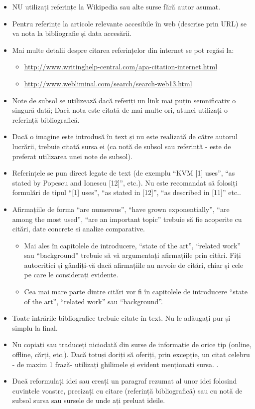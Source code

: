 \documentclass[12pt,a4paper]{report}
\begin{document}
\begin{itemize}
	\item 	NU utilizați referințe la Wikipedia sau alte surse fără autor asumat.
	\item 	Pentru referințe la articole relevante accesibile în web (descrise prin URL) se va nota la bibliografie și data accesării.
	\item 	Mai multe detalii despre citarea referințelor din internet se pot regăsi la:
	\begin{itemize}
		\item	\url{http://www.writinghelp-central.com/apa-citation-internet.html}
		\item	\url{http://www.webliminal.com/search/search-web13.html}
	\end{itemize}
	\item 	Note de subsol se utilizează dacă referiți un link mai puțin semnificativ o singură dată; Dacă nota este citată de mai multe ori, atunci utilizați o referință bibliografică.
	\item 	Dacă o imagine este introdusă în text și nu este realizată de către autorul lucrării, trebuie citată sursa ei (ca notă de subsol sau referință - este de preferat utilizarea unei note de subsol).
	\item 	Referințele se pun direct legate de text (de exemplu ``KVM [1] uses'', ``as stated by Popescu and Ionescu [12]'', etc.). Nu este recomandat să folosiți formulări de tipul ``[1] uses'', ``as stated in [12]'', ``as described in [11]'' etc..
	\item 	Afirmațiile de forma ``are numerous'', ``have grown exponentially'', ``are among the most used'', ``are an important topic'' trebuie să fie acoperite cu citări, date concrete si analize comparative.
	\begin{itemize}
		\item	Mai ales în capitolele de introducere, ``state of the art'', ``related work'' sau ``background'' trebuie să vă argumentați afirmațiile prin citări. Fiți autocritici și gândiți-vă dacă afirmațiile au nevoie de citări, chiar și cele pe care le considerați evidente.
		\item	Cea mai mare parte dintre citări vor fi în capitolele de introducere ``state of the art'', ``related work'' sau ``background''.
	\end{itemize}
	\item 	Toate intrările bibliografice trebuie citate în text. Nu le adăugați pur și simplu la final.
	\item 	Nu copiați sau traduceți niciodată din surse de informație de orice tip (online, offline, cărți, etc.). Dacă totuși doriți să oferiți, prin excepție, un citat celebru - de maxim 1 frază- utilizați ghilimele și evident menționați sursa. .
	\item 	Dacă reformulați idei sau creați un paragraf rezumat al unor idei folosind cuvintele voastre, precizați cu citare (referință bibliografică) sau cu notă de subsol sursa sau sursele de unde ați preluat ideile.
\end{itemize}
\end{document}
